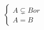 \documentclass[preview]{standalone}
\begin{document}
\begin{align*}
\begin{cases}
                         A \subsetneq B or\\
                         A = B
                         \end{cases}
\end{align*}
\end{document}

